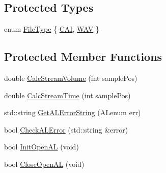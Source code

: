 \subsection*{Protected Types}
\begin{DoxyCompactItemize}
\item 
enum \hyperlink{classmts_open_a_l_play_a69403fe8d56192bf43c92ead689f4cf7}{File\+Type} \{ \hyperlink{classmts_open_a_l_play_a69403fe8d56192bf43c92ead689f4cf7ac4f39c368f78ea94196d522d5663b604}{C\+A\+I}, 
\hyperlink{classmts_open_a_l_play_a69403fe8d56192bf43c92ead689f4cf7a0836988f58bd92f7644e30453bf421b2}{W\+A\+V}
 \}
\end{DoxyCompactItemize}
\subsection*{Protected Member Functions}
\begin{DoxyCompactItemize}
\item 
double \hyperlink{classmts_open_a_l_play_a0ac6b3948a7f3a9a0c78682ee95e0d85}{Calc\+Stream\+Volume} (int sample\+Pos)
\item 
double \hyperlink{classmts_open_a_l_play_ac2616803fafe20bdc10dee85ba97433f}{Calc\+Stream\+Time} (int sample\+Pos)
\item 
std\+::string \hyperlink{classmts_open_a_l_play_a7851ce30c950784a75b9f2979ca90bb9}{Get\+A\+L\+Error\+String} (A\+Lenum err)
\item 
bool \hyperlink{classmts_open_a_l_play_a5e8c6b07650e9137232255dec6d443a6}{Check\+A\+L\+Error} (std\+::string \&error)
\item 
bool \hyperlink{classmts_open_a_l_play_a21f76e5a63a314439324f5456b93eb87}{Init\+Open\+A\+L} (void)
\item 
bool \hyperlink{classmts_open_a_l_play_ad75e7330a2213fa6d7491701d47bc157}{Close\+Open\+A\+L} (void)
\end{DoxyCompactItemize}
